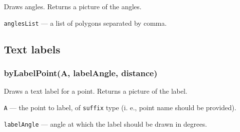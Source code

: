 \documentclass{ltxdoc}
\begin{document}
Draws angles. Returns a picture of the angles.

\texttt{anglesList} — a list of polygons separated by comma.







\subsection{Text labels}


\subsubsection{byLabelPoint(A, labelAngle, distance)}
Draws a text label for a point. Returns a picture of the label.

\texttt{A} — the point to label, of \texttt{suffix} type (i. e., point name should be provided).

\texttt{labelAngle} — angle at which the label should be drawn in degrees.
\end{document}
